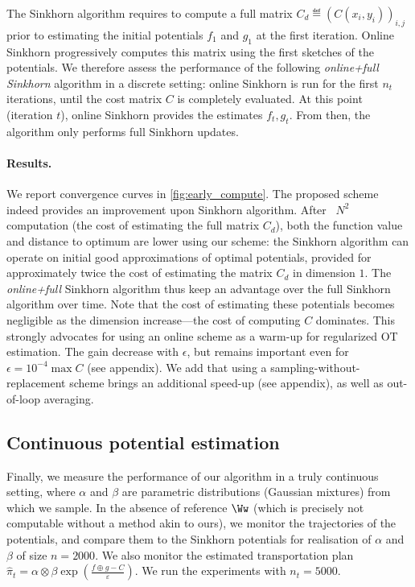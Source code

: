 The Sinkhorn algorithm requires to compute a full matrix $C_d \eqdef (C(x_i,y_i))_{i,j}$ prior to estimating
the initial potentials $f_1$ and $g_1$ at the first iteration. Online Sinkhorn progressively computes this
matrix using the first sketches of the potentials. We therefore assess the
performance of the following \textit{online+full Sinkhorn} algorithm in a
discrete setting: online Sinkhorn is run for the first $n_t$ iterations, until
the cost matrix $C$ is completely evaluated. At this point (iteration $t$),
online Sinkhorn provides the estimates $f_{t}, g_{t}$. From then, the algorithm
only performs full Sinkhorn updates.

\paragraph{Results.} We report convergence curves in
\autoref{fig:early_compute}. The proposed scheme indeed provides an improvement
upon Sinkhorn algorithm. After  $N^2$ computation (the cost of estimating the full matrix $C_d$),
both the function value and distance to optimum are lower using our scheme: the
Sinkhorn algorithm can operate on initial good approximations of optimal
potentials, provided for approximately twice the cost of estimating the matrix
$C_d$ in dimension $1$. The \textit{online+full} Sinkhorn algorithm thus keep an
advantage over the full Sinkhorn algorithm over time. Note that the cost of
estimating these potentials becomes negligible as the dimension increase---the
cost of computing $C$ dominates. This strongly advocates for using an online
scheme as a warm-up for regularized OT estimation. The gain decrease with
$\epsilon$, but remains important even for $\epsilon = 10^{-4} \max C$ (see
appendix). We add that using a
sampling-without-replacement scheme brings an additional speed-up (see appendix), as well as out-of-loop averaging.

\subsection{Continuous potential estimation}

Finally, we measure the performance of our algorithm in a truly continuous
setting, where $\alpha$ and $\beta$ are parametric distributions (Gaussian
mixtures) from which we sample. In the absence of reference $\Ww$ (which is
precisely not computable without a method akin to ours), we monitor the
trajectories of the potentials, and compare them to the Sinkhorn potentials for
realisation of $\alpha$ and $\beta$ of size $n=2000$. We also monitor the
estimated transportation plan $\hat \pi_t = \alpha \otimes \beta
\exp(\frac{f\oplus g - C}{\varepsilon})$. We run the experiments with
$n_t=5000$.

